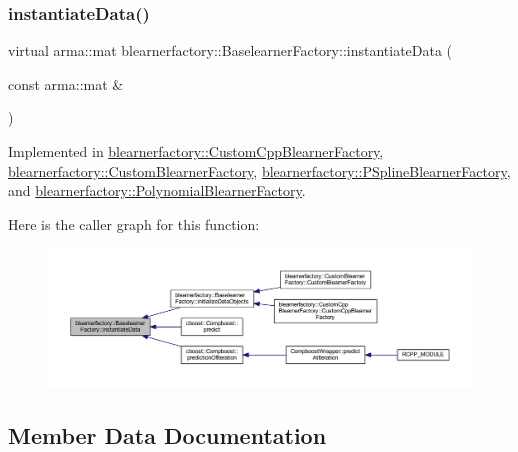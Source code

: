 \subsubsection{\texorpdfstring{instantiate\+Data()}{instantiateData()}}
{\footnotesize\ttfamily virtual arma\+::mat blearnerfactory\+::\+Baselearner\+Factory\+::instantiate\+Data (\begin{DoxyParamCaption}\item[{const arma\+::mat \&}]{ }\end{DoxyParamCaption})\hspace{0.3cm}{\ttfamily [pure virtual]}}



Implemented in \mbox{\hyperlink{classblearnerfactory_1_1_custom_cpp_blearner_factory_abc9c251017197087af3ef8a1c0421969}{blearnerfactory\+::\+Custom\+Cpp\+Blearner\+Factory}}, \mbox{\hyperlink{classblearnerfactory_1_1_custom_blearner_factory_aac818f8969820d37ec1a391abbb996da}{blearnerfactory\+::\+Custom\+Blearner\+Factory}}, \mbox{\hyperlink{classblearnerfactory_1_1_p_spline_blearner_factory_a290a1c60224d027059939a895b474aa1}{blearnerfactory\+::\+P\+Spline\+Blearner\+Factory}}, and \mbox{\hyperlink{classblearnerfactory_1_1_polynomial_blearner_factory_aeea9c480671ae7cf7d3be470ce0feaef}{blearnerfactory\+::\+Polynomial\+Blearner\+Factory}}.

Here is the caller graph for this function\+:\nopagebreak
\begin{figure}[H]
\begin{center}
\leavevmode
\includegraphics[width=350pt]{classblearnerfactory_1_1_baselearner_factory_ac4a38c4815fb33b8d4785745117c5e57_icgraph}
\end{center}
\end{figure}


\subsection{Member Data Documentation}
\mbox{\label{classblearnerfactory_1_1_baselearner_factory_a3382b7d9833484f63755a26447a5d2e4}} 
